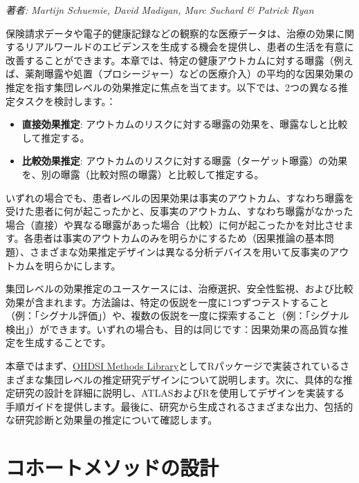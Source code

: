 \documentclass[
  11pt]{book}
\providecommand{\tightlist}{%
  \setlength{\itemsep}{0pt}\setlength{\parskip}{0pt}}
\theoremstyle{definition}
\theoremstyle{definition}
\theoremstyle{definition}
\theoremstyle{definition}
\theoremstyle{remark}
\begin{document}
\emph{著者: Martijn Schuemie, David Madigan, Marc Suchard \& Patrick Ryan}


保険請求データや電子的健康記録などの観察的な医療データは、治療の効果に関するリアルワールドのエビデンスを生成する機会を提供し、患者の生活を有意に改善することができます。本章では、特定の健康アウトカムに対する曝露（例えば、薬剤曝露や処置（プロシージャー）などの医療介入）の平均的な因果効果の推定を指す集団レベルの効果推定に焦点を当てます。以下では、2つの異なる推定タスクを検討します。：

\begin{itemize}
\tightlist
\item
  \textbf{直接効果推定}: アウトカムのリスクに対する曝露の効果を、曝露なしと比較して推定する。 
\item
  \textbf{比較効果推定}: アウトカムのリスクに対する曝露（ターゲット曝露）の効果を、別の曝露（比較対照の曝露）と比較して推定する。 
\end{itemize}

いずれの場合でも、患者レベルの因果効果は事実のアウトカム、すなわち曝露を受けた患者に何が起こったかと、反事実のアウトカム、すなわち曝露がなかった場合（直接）や異なる曝露があった場合（比較）に何が起こったかを対比させます。各患者は事実のアウトカムのみを明らかにするため（因果推論の基本問題）、さまざまな効果推定デザインは異なる分析デバイスを用いて反事実のアウトカムを明らかにします。 

集団レベルの効果推定のユースケースには、治療選択、安全性監視、および比較効果が含まれます。方法論は、特定の仮説を一度に1つずつテストすること（例：「シグナル評価」）や、複数の仮説を一度に探索すること（例：「シグナル検出」）ができます。いずれの場合も、目的は同じです：因果効果の高品質な推定を生成することです。  

本章ではまず、\href{https://ohdsi.github.io/MethodsLibrary/}{OHDSI Methods Library}としてRパッケージで実装されているさまざまな集団レベルの推定研究デザインについて説明します。次に、具体的な推定研究の設計を詳細に説明し、ATLASおよびRを使用してデザインを実装する手順ガイドを提供します。最後に、研究から生成されるさまざまな出力、包括的な研究診断と効果量の推定について確認します。

\section{コホートメソッドの設計}\label{CohortMethod}
\end{document}
